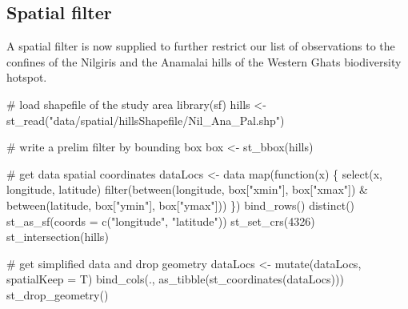 \documentclass[
]{article}
\newenvironment{Shaded}{}{}
\newcommand{\CommentTok}[1]{\textcolor[rgb]{0.00,0.50,0.00}{#1}}
\newcommand{\ControlFlowTok}[1]{\textcolor[rgb]{0.00,0.00,1.00}{#1}}
\newcommand{\DataTypeTok}[1]{#1}
\newcommand{\DecValTok}[1]{#1}
\newcommand{\KeywordTok}[1]{\textcolor[rgb]{0.00,0.00,1.00}{#1}}
\newcommand{\NormalTok}[1]{#1}
\newcommand{\OperatorTok}[1]{#1}
\newcommand{\StringTok}[1]{\textcolor[rgb]{0.00,0.50,0.50}{#1}}
\begin{document}
\hypertarget{spatial-filter}{%
\subsection{Spatial filter}\label{spatial-filter}}

A spatial filter is now supplied to further restrict our list of observations to the confines of the Nilgiris and the Anamalai hills of the Western Ghats biodiversity hotspot.

\begin{Shaded}
\begin{Highlighting}[]
\CommentTok{# load shapefile of the study area}
\KeywordTok{library}\NormalTok{(sf)}
\NormalTok{hills <-}\StringTok{ }\KeywordTok{st_read}\NormalTok{(}\StringTok{"data/spatial/hillsShapefile/Nil_Ana_Pal.shp"}\NormalTok{)}

\CommentTok{# write a prelim filter by bounding box}
\NormalTok{box <-}\StringTok{ }\KeywordTok{st_bbox}\NormalTok{(hills)}

\CommentTok{# get data spatial coordinates}
\NormalTok{dataLocs <-}\StringTok{ }\NormalTok{data }\OperatorTok{%
\StringTok{  }\KeywordTok{map}\NormalTok{(}\ControlFlowTok{function}\NormalTok{(x) \{}
    \KeywordTok{select}\NormalTok{(x, longitude, latitude) }\OperatorTok{%
\StringTok{      }\KeywordTok{filter}\NormalTok{(}\KeywordTok{between}\NormalTok{(longitude, box[}\StringTok{"xmin"}\NormalTok{], box[}\StringTok{"xmax"}\NormalTok{]) }\OperatorTok{&}
\StringTok{        }\KeywordTok{between}\NormalTok{(latitude, box[}\StringTok{"ymin"}\NormalTok{], box[}\StringTok{"ymax"}\NormalTok{]))}
\NormalTok{  \}) }\OperatorTok{%
\StringTok{  }\KeywordTok{bind_rows}\NormalTok{() }\OperatorTok{%
\StringTok{  }\KeywordTok{distinct}\NormalTok{() }\OperatorTok{%
\StringTok{  }\KeywordTok{st_as_sf}\NormalTok{(}\DataTypeTok{coords =} \KeywordTok{c}\NormalTok{(}\StringTok{"longitude"}\NormalTok{, }\StringTok{"latitude"}\NormalTok{)) }\OperatorTok{%
\StringTok{  }\KeywordTok{st_set_crs}\NormalTok{(}\DecValTok{4326}\NormalTok{) }\OperatorTok{%
\StringTok{  }\KeywordTok{st_intersection}\NormalTok{(hills)}

\CommentTok{# get simplified data and drop geometry}
\NormalTok{dataLocs <-}\StringTok{ }\KeywordTok{mutate}\NormalTok{(dataLocs, }\DataTypeTok{spatialKeep =}\NormalTok{ T) }\OperatorTok{%
\StringTok{  }\KeywordTok{bind_cols}\NormalTok{(., }\KeywordTok{as_tibble}\NormalTok{(}\KeywordTok{st_coordinates}\NormalTok{(dataLocs))) }\OperatorTok{%
\StringTok{  }\KeywordTok{st_drop_geometry}\NormalTok{()}

}}}}}}}}}
\end{Highlighting}
\end{Shaded}
\end{document}
